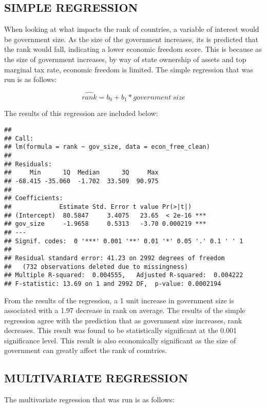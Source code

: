 \documentclass[
  11pt,
]{article}
\begin{document}
\hypertarget{simple-regression}{%
\subsection{SIMPLE REGRESSION}\label{simple-regression}}

When looking at what impacts the rank of countries, a variable of
interest would be government size. As the size of the government
increases, its is predicted that the rank would fall, indicating a lower
economic freedom score. This is because as the size of government
increases, by way of state ownership of assets and top marginal tax
rate, economic freedom is limited. The simple regression that was run is
as follows:

\[ \hat{rank} = b_0 + b_1 * government \ size \]

The results of this regression are included below:

\begin{verbatim}
## 
## Call:
## lm(formula = rank ~ gov_size, data = econ_free_clean)
## 
## Residuals:
##     Min      1Q  Median      3Q     Max 
## -68.415 -35.060  -1.702  33.509  90.975 
## 
## Coefficients:
##             Estimate Std. Error t value Pr(>|t|)    
## (Intercept)  80.5847     3.4075   23.65  < 2e-16 ***
## gov_size     -1.9658     0.5313   -3.70 0.000219 ***
## ---
## Signif. codes:  0 '***' 0.001 '**' 0.01 '*' 0.05 '.' 0.1 ' ' 1
## 
## Residual standard error: 41.23 on 2992 degrees of freedom
##   (732 observations deleted due to missingness)
## Multiple R-squared:  0.004555,   Adjusted R-squared:  0.004222 
## F-statistic: 13.69 on 1 and 2992 DF,  p-value: 0.0002194
\end{verbatim}

From the results of the regression, a 1 unit increase in government size
is associated with a 1.97 decrease in rank on average. The results of
the simple regression agree with the prediction that as government size
increases, rank decreases. This result was found to be statistically
significant at the 0.001 significance level. This result is also
economically significant as the size of government can greatly affect
the rank of countries.

\hypertarget{multivariate-regression}{%
\subsection{MULTIVARIATE REGRESSION}\label{multivariate-regression}}

The multivariate regression that was run is as follows:
\end{document}
